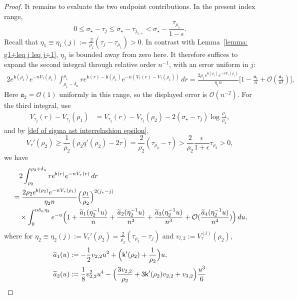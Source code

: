 \documentclass[a4paper]{article}
\numberwithin{equation}{section}
\begin{document}
\begin{proof}
It remains to evaluate the two endpoint contributions. In the present index range,
\[
0\leq\sigma_{\star}-\tau_j\leq \sigma_{\star}-\tau_{j_{1,+}}< \sigma_{\star}-\frac{\tau_{\rho_1}}{1-\epsilon}.
\]
Recall that $\eta_1\equiv\eta_1(j):=\frac{2}{\rho_1}(\tau_j-\tau_{\rho_1})>0$. In contrast with Lemma~\ref{lemma: g1+leq j leq j+1}, $\eta_1$ is bounded away from zero here. It therefore suffices to expand the second integral through relative order $n^{-1}$, with an error uniform in $j$:
\begin{align*}
2e^{\mathsf{k}(\rho_1)}e^{-nV_{\tau}(\rho_1)}
\int_{\rho_1-\delta_n}^{\rho_1} r e^{\mathsf{k}(r)-\mathsf{k}(\rho_1)}e^{-n(V_{\tau}(r)-V_{\tau}(\rho_1))}\,dr
=
\frac{2\rho_1e^{\mathsf{k}(\rho_1)}e^{-nV_{\tau}(\rho_1)}}{\eta_1 n}
\bigg[1-\frac{\mathfrak{a}_1}{n}+\mathcal{O}(\frac{\mathfrak{a}_2}{n^2})\bigg], 
\end{align*}
Here $\mathfrak a_2=\mathcal O(1)$ uniformly in this range, so the displayed error is $\mathcal O(n^{-2})$. For the third integral, use
\begin{align*}
    V_{\tau_j}(r)-V_{\tau_j}(\rho_1)
&=V_{\tau_j}(r)-V_{\tau_j}(\rho_2)-2(\sigma_{\star}-\tau_j)\log\frac{\rho_1}{\rho_2},
\end{align*}
and by \eqref{def of sigma ast interrelashion epsilon}, 
\[
V_{\tau}'(\rho_2)\geq\frac{1}{\rho_2}(\rho_2q'(\rho_2)-2\tau)
=\frac{2}{\rho_2}(\tau_{\rho_2}-\tau)>\frac{2}{\rho_2}\frac{\epsilon}{1+\epsilon}\tau_{\rho_2}>0,
\]
we have 
\begin{align*}
&\quad 2\int_{\rho_2}^{\rho_2+\delta_n}re^{\mathsf{k}(r)}e^{-nV_{\tau}(r)}\,dr 
\\
&=
\frac{2\rho_2e^{\mathsf{k}(\rho_2)}e^{-nV_{\tau}(\rho_1)}}{\eta_2n}
\Bigl(\frac{\rho_1}{\rho_2}\Bigr)^{2(j_{\star}-j)}
\\
&\quad\times
\int_{0}^{n\delta_n\eta_2}
e^{-u}
\Bigl( 
1+\frac{\widetilde{a}_{1}(\eta_2^{-1}u)}{n}+\frac{\widetilde{a}_{2}(\eta_2^{-1}u)}{n^2}+\frac{\widetilde{a}_{3}(\eta_2^{-1}u)}{n^3}+\mathcal{O}(\frac{\widetilde{a}_{4}(\eta_2^{-1}u)}{n^4})
\Bigr)\,du, 
\end{align*}
where for $\eta_2\equiv\eta_2(j):=V_{\tau}'(\rho_2)=\frac{2}{\rho_2}(\tau_{\rho_2}-\tau_j)$ and $v_{l,2}:=V_{\tau}^{(l)}(\rho_2)$, 
\begin{align*}
 \widetilde{a}_{1}(u)&:=-\frac{1}{2}v_{2,2}u^2+\Bigl(\mathsf{k}'(\rho_2)+\frac{1}{\rho_2}\Bigr)u, 
 \\
 \widetilde{a}_{2}(u)&:=\frac{1}{8}v_{2,2}^2u^4
 -\Bigl(\frac{3v_{2,2}}{\rho_2}+3\mathsf{k}'(\rho_2)v_{2,2}+v_{3,2}\Bigr)\frac{u^3}{6}

\end{align*}
\end{proof}
\end{document}
